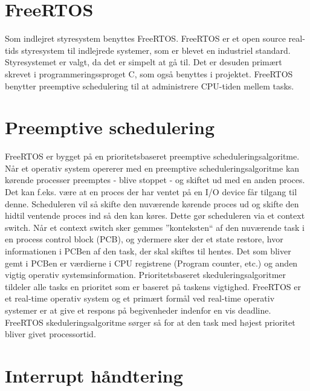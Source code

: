 \section{FreeRTOS}
Som indlejret styresystem benyttes FreeRTOS. 
FreeRTOS er et open source real-tids styresystem til indlejrede systemer, som er blevet en industriel standard. 
Styresystemet er valgt, da det er simpelt at gå til. 
Det er desuden primært skrevet i programmeringssproget C, som også benyttes i projektet. 
FreeRTOS benytter preemptive schedulering til at administrere CPU-tiden mellem tasks. 

\section{Preemptive schedulering}
FreeRTOS er bygget på en prioritetsbaseret preemptive scheduleringsalgoritme.\newline
Når et operativ system opererer med en preemptive scheduleringsalgoritme kan kørende processer preemptes - blive stoppet - og skiftet ud med en anden proces.\newline
Det kan f.eks. være at en proces der har ventet på en I/O device får tilgang til denne.
Scheduleren vil så skifte den nuværende kørende proces ud og skifte den hidtil ventende proces ind så den kan køres.
Dette gør scheduleren via et context switch.\newline
Når et context switch sker gemmes ''konteksten`` af den nuværende task i en process control block (PCB), og ydermere sker der et state restore, hvor informationen i PCBen af den task, der skal skiftes til hentes.
Det som bliver gemt i PCBen er værdierne i CPU registrene (Program counter, etc.) og anden vigtig operativ systemsinformation.\newline
Prioritetsbaseret skeduleringsalgoritmer tildeler alle tasks en prioritet som er baseret på taskens vigtighed.\newline
FreeRTOS er et real-time operativ system og et primært formål ved real-time operativ systemer er at give et respons på begivenheder indenfor en vis deadline.
FreeRTOS skeduleringsalgoritme sørger så for at den task med højest prioritet bliver givet processortid.


\section{Interrupt håndtering}
